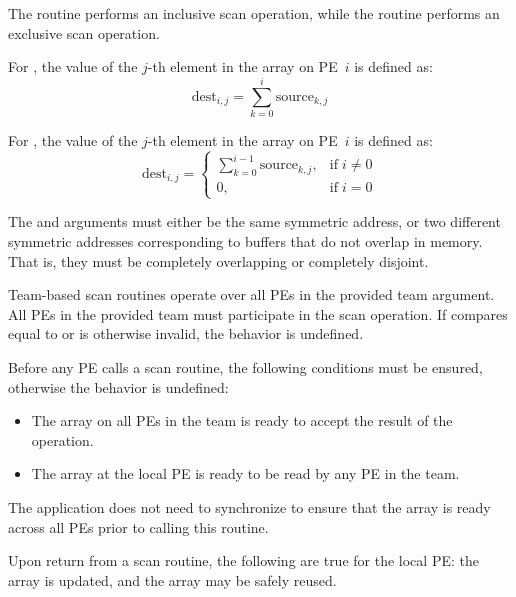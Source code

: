 \begin{apidefinition}
{  The  routine performs an inclusive scan
  operation, while the  routine performs an
  exclusive scan operation.  

  For , the value of the $j$-th element in
  the  array on \ac{PE}~$i$ is defined as:
  \begin{equation*}
    \textrm{dest}_{i,j} = \displaystyle\sum_{k=0}^{i} \textrm{source}_{k,j}
  \end{equation*}

  For , the value of the $j$-th element in
  the  array on \ac{PE}~$i$ is defined as:
  \begin{equation*}
    \textrm{dest}_{i,j} =
    \begin{cases}
    \displaystyle\sum_{k=0}^{i-1} \textrm{source}_{k,j}, & \text{if} \; i \neq 0 \\
    0,  & \text{if} \; i = 0
    \end{cases}
  \end{equation*}

  The \source{} and \dest{} arguments must either be the same
  symmetric address, or two different symmetric addresses
  corresponding to buffers that do not overlap in memory. That is,
  they must be completely overlapping or completely disjoint.

  Team-based scan routines operate over all \acp{PE} in the provided
  team argument. All \acp{PE} in the provided team must participate in
  the scan operation.  If  compares equal to
   or is otherwise invalid, the
  behavior is undefined.

  Before any \ac{PE} calls a scan routine, the following conditions must be
  ensured, otherwise the behavior is undefined:
  \begin{itemize}
      \item The \dest{} array on all \acp{PE} in the team is ready to accept
          the result of the operation.
      \item The \source{} array at the local \ac{PE} is ready to be read by
          any \ac{PE} in the team.
  \end{itemize}
  The application does not need to synchronize to ensure that the \source{}
  array is ready across all \acp{PE} prior to calling this routine.
  
  Upon return from a scan routine, the following are true for the
  local \ac{PE}: the \dest{} array is updated, and the \source{} array
  may be safely reused.

}
\end{apidefinition}
